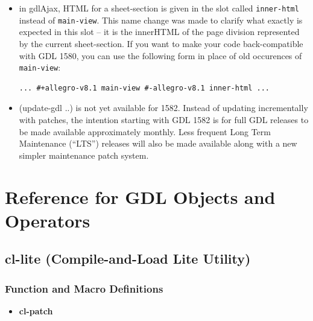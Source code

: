 \documentclass [11pt]{book}
\begin{document}
\begin{itemize}
\item in gdlAjax, HTML for a sheet-section is given in the slot called \texttt{inner-html} instead of \texttt{main-view}. This name change was made to clarify what exactly is
	 expected in this slot -- it is the innerHTML of the page
	 division represented by the current sheet-section. If you
	 want to make your code back-compatible with GDL 1580, you can
	 use the following form in place of old occurences of \texttt{main-view}: 

\begin{verbatim}... #+allegro-v8.1 main-view #-allegro-v8.1 inner-html ...
\end{verbatim}

\item (update-gdl ..) is not yet available for 1582. Instead
of updating incrementally with patches, the intention starting with
GDL 1582 is for full GDL releases to be made available approximately
monthly. Less frequent Long Term Maintenance (``LTS'') releases will
also be made available along with a new simpler maintenance patch
system.

\end{itemize}



\chapter{Reference for GDL Objects and Operators}

\label{chap:referenceforgdlobjectsandoperators}



\section{cl-lite (Compile-and-Load Lite Utility)}

\label{sec:cl-lite(compile-and-loadliteutility)}


\subsection{Function and Macro Definitions}


\begin{itemize}

\item {}
\label{prim:cl-patch}
\textbf{cl-patch}





\end{itemize}
\end{document}
